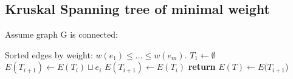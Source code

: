 \documentclass{article}
\theoremstyle{definition}
\theoremstyle{remark}
\begin{document}
\subsection*{Kruskal Spanning tree of minimal weight}
Assume graph G is connected:
\begin{algorithm}
    
    \begin{algorithmic}
    \Require Sorted edges by weight: $w(e_1) \leq ... \leq w(e_m)$.
    \State $T_1 \gets \emptyset$
            \State $E(T_{i+1}) \gets E(T_i) \sqcup e_i $
        \Else
            \State $E(T_{i+1}) \gets E(T_i) $
        \EndIf
            \State \textbf{return} $E(T) \gets E(T_{i+1}$)
        \EndIf
    \EndFor
    \end{algorithmic}
    \end{algorithm}
\end{document}
